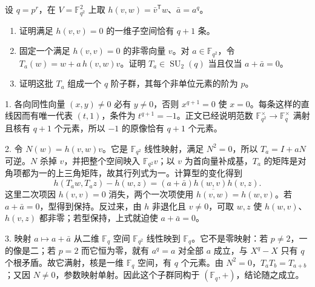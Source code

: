 \begin{exercise}\label{b5:ex:F-unitary-isotropic-root}
	设 \(q=p^r\)，在 \(V=\mathbb F_{q^2}^2\) 上取 \(h(v,w)=\bar v^{\mathsf T}w\)、\(\bar a=a^q\)。
	\begin{enumerate}
		\item 证明满足 \(h(v,v)=0\) 的一维子空间恰有 \(q+1\) 条。
		\item 固定一个满足 \(h(v,v)=0\) 的非零向量 \(v\)。对 \(a\in\mathbb F_{q^2}\)，令 \(T_a(w)=w+a\,h(v,w)v\)。证明 \(T_a\in\operatorname{SU}_2(q)\) 当且仅当 \(a+\bar a=0\)。
		\item 证明这批 \(T_a\) 组成一个 \(q\) 阶子群，其每个非单位元素的阶为 \(p\)。
	\end{enumerate}
\end{exercise}
\begin{solution}
	1. 各向同性向量 \((x,y)\ne0\) 必有 \(y\ne0\)，否则 \(x^{q+1}=0\) 使 \(x=0\)。每条这样的直线因而有唯一代表 \((t,1)\)，条件为 \(t^{q+1}=-1\)。正文已经说明范数 \(\mathbb F_{q^2}^\times\to\mathbb F_q^\times\) 满射且核有 \(q+1\) 个元素，所以 \(-1\) 的原像恰有 \(q+1\) 个元素。

	2. 令 \(N(w)=h(v,w)v\)。它是 \(\mathbb F_{q^2}\) 线性映射，满足 \(N^2=0\)，所以 \(T_a=I+aN\) 可逆。\(N\) 杀掉 \(v\)，并把整个空间映入 \(\mathbb F_{q^2}v\)；以 \(v\) 为首向量补成基，\(T_a\) 的矩阵是对角项都为一的上三角矩阵，故其行列式为一。计算型的变化得到
	\[
		h(T_aw,T_az)-h(w,z)
		=(a+\bar a)h(w,v)h(v,z).
	\]
	这里二次项因 \(h(v,v)=0\) 消失，两个一次项使用 \(\overline{h(v,w)}=h(w,v)\)。若 \(a+\bar a=0\)，型得到保持。反过来，由 \(h\) 非退化且 \(v\ne0\)，可取 \(w,z\) 使 \(h(w,v)\)、\(h(v,z)\) 都非零；若型保持，上式就迫使 \(a+\bar a=0\)。

	3. 映射 \(a\mapsto a+\bar a\) 从二维 \(\mathbb F_q\) 空间 \(\mathbb F_{q^2}\) 线性映到 \(\mathbb F_q\)。它不是零映射：若 \(p\ne2\)，一的像是二；若 \(p=2\) 而它恒为零，就有 \(a^q=a\) 对全部 \(a\) 成立，与 \(X^q-X\) 只有 \(q\) 个根矛盾。故它满射，核是一维 \(\mathbb F_q\) 空间，有 \(q\) 个元素。由 \(N^2=0\)，\(T_aT_b=T_{a+b}\)；又因 \(N\ne0\)，参数映射单射。因此这个子群同构于 \((\mathbb F_q,+)\)，结论随之成立。
\end{solution}

